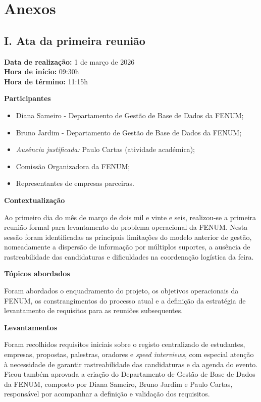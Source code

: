 \documentclass[12pt,a4paper]{article}
\begin{document}
\newpage
\section*{Anexos}

\subsection*{I. Ata da primeira reunião}

\textbf{Data de realização:} 1 de março de 2026 \\
\textbf{Hora de início:} 09:30h \\
\textbf{Hora de término:} 11:15h

\textbf{Participantes}
\begin{itemize}[leftmargin=1.5cm]
    \item Diana Sameiro - Departamento de Gestão de Base de Dados da FENUM;
    \item Bruno Jardim - Departamento de Gestão de Base de Dados da FENUM;
    \item \textit{Ausência justificada:} Paulo Cartas (atividade académica);
    \item Comissão Organizadora da FENUM;
    \item Representantes de empresas parceiras.
\end{itemize}

\textbf{Contextualização}

Ao primeiro dia do mês de março de dois mil e vinte e seis, realizou-se a
primeira reunião formal para levantamento do problema operacional da FENUM.
Nesta sessão foram identificadas as principais limitações do modelo anterior de
gestão, nomeadamente a dispersão de informação por múltiplos suportes, a
ausência de rastreabilidade das candidaturas e dificuldades na coordenação
logística da feira.

\textbf{Tópicos abordados}

Foram abordados o enquadramento do projeto, os objetivos operacionais da FENUM,
os constrangimentos do processo atual e a definição da estratégia de
levantamento de requisitos para as reuniões subsequentes.

\textbf{Levantamentos}

Foram recolhidos requisitos iniciais sobre o registo centralizado de estudantes,
empresas, propostas, palestras, oradores e \textit{speed interviews}, com
especial atenção à necessidade de garantir rastreabilidade das candidaturas e da
agenda do evento. Ficou também aprovada a criação do Departamento de Gestão de
Base de Dados da FENUM, composto por Diana Sameiro, Bruno Jardim e Paulo Cartas,
responsável por acompanhar a definição e validação dos requisitos.
\end{document}
